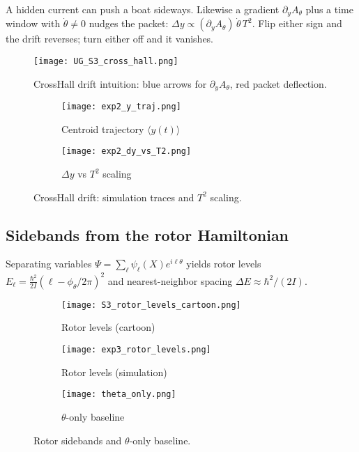 \begin{idea}
A hidden current can push a boat sideways. Likewise a gradient $\partial_y A_\theta$ plus a time window with $\dot\theta\neq 0$ nudges the packet: $\Delta y\propto(\partial_y A_\theta)\,\dot\theta\,T^2$. Flip either sign and the drift reverses; turn either off and it vanishes.
\end{idea}

\begin{figure}[h]
  \centering
  \texttt{[image: UG\_S3\_cross\_hall.png]}
  \caption{Cross\textendash Hall drift intuition: blue arrows for $\partial_yA_\theta$, red packet deflection.}
  \label{fig:cross-hall-cartoon2}
\end{figure}

\begin{figure}[h]
  \centering
  \begin{subfigure}[b]{0.48\linewidth}
    \centering
    \texttt{[image: exp2\_y\_traj.png]}
    \caption{Centroid trajectory $\langle y(t)\rangle$}
    \label{fig:cross-hall-traj}
  \end{subfigure}\hfill
  \begin{subfigure}[b]{0.48\linewidth}
    \centering
    \texttt{[image: exp2\_dy\_vs\_T2.png]}
    \caption{$\Delta y$ vs $T^2$ scaling}
    \label{fig:cross-hall-scaling}
  \end{subfigure}
  \caption{Cross\textendash Hall drift: simulation traces and $T^2$ scaling.}
  \label{fig:cross-hall}
\end{figure}


\subsection{Sidebands from the rotor Hamiltonian}\label{sec:sidebands}
Separating variables $\Psi=\sum_{\ell}\psi_\ell(X)e^{i\ell\theta}$ yields rotor levels $E_\ell=\frac{\hbar^2}{2I}(\ell-\phi_\theta/2\pi)^2$ and nearest-neighbor spacing $\Delta E\approx\hbar^2/(2I)$.

\begin{figure}[h]
  \centering
  \begin{subfigure}[b]{0.48\linewidth}
    \centering
  \texttt{[image: S3\_rotor\_levels\_cartoon.png]}
    \caption{Rotor levels (cartoon)}
    \label{fig:rotor-cartoon}
  \end{subfigure}\hfill
  \begin{subfigure}[b]{0.48\linewidth}
    \centering
    \texttt{[image: exp3\_rotor\_levels.png]}
    \caption{Rotor levels (simulation)}
    \label{fig:rotor-sim}
  \end{subfigure}
  \begin{subfigure}[b]{0.48\linewidth}
    \centering
  \texttt{[image: theta\_only.png]}
    \caption{$\theta$-only baseline}
    \label{fig:theta-only}
  \end{subfigure}
  \caption{Rotor sidebands and $\theta$-only baseline.}
  \label{fig:rotor}
\end{figure}

